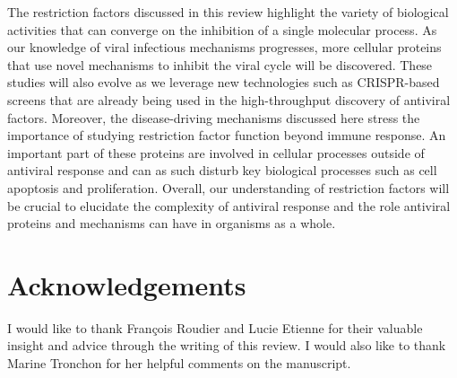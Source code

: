 \documentclass{enslyonreview}
\begin{document}
The restriction factors discussed in this review highlight the variety of biological
activities that can converge on the inhibition of a single molecular process. As our knowledge
of viral infectious mechanisms progresses, more cellular proteins that use novel mechanisms to
inhibit the viral cycle will be discovered. These studies will also evolve as we leverage new
technologies such as CRISPR-based screens that are already being used in the high-throughput
discovery of antiviral factors. Moreover, the disease-driving mechanisms discussed here stress
the importance of studying restriction factor function beyond immune response. An important
part of these proteins are involved in cellular processes outside of antiviral response and
can as such disturb key biological processes such as cell apoptosis and proliferation.
Overall, our understanding of restriction factors will be crucial to elucidate the complexity
of antiviral response and the role antiviral proteins and mechanisms can have in organisms as
a whole.

\section*{Acknowledgements}
I would like to thank François Roudier and Lucie Etienne for their valuable insight and advice
through the writing of this review. I would also like to thank Marine Tronchon for her helpful
comments on the manuscript.

\printbibliography[title=References]

\balance
\end{document}
